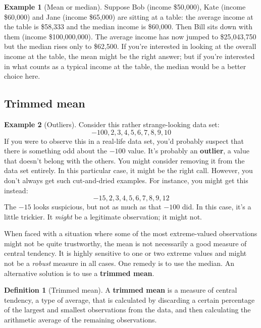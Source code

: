 \documentclass[
]{book}
\theoremstyle{definition}
\newtheorem{definition}{Definition}[chapter]
\theoremstyle{definition}
\newtheorem{example}{Example}[chapter]
\theoremstyle{definition}
\theoremstyle{definition}
\theoremstyle{remark}
\begin{document}
\begin{example}[Mean or median]
\protect\hypertarget{exm:exmeanmedian}{}\label{exm:exmeanmedian}Suppose Bob (income \$50,000), Kate (income \$60,000) and Jane (income \$65,000) are sitting at a table: the average income at the table is \$58,333 and the median income is \$60,000. Then Bill sits down with them (income \$100,000,000). The average income has now jumped to \$25,043,750 but the median rises only to \$62,500. If you're interested in looking at the overall income at the table, the mean might be the right answer; but if you're interested in what counts as a typical income at the table, the median would be a better choice here.
\end{example}

\hypertarget{trimmedmean}{%
\subsection{Trimmed mean}\label{trimmedmean}}

\begin{example}[Outliers]
\protect\hypertarget{exm:exoutliers}{}\label{exm:exoutliers}Consider this rather strange-looking data set:
\[
-100,2,3,4,5,6,7,8,9,10
\]
If you were to observe this in a real-life data set, you'd probably suspect that there is something odd about the \(-100\) value. It's probably an \textbf{outlier}, a value that doesn't belong with the others. You might consider removing it from the data set entirely. In this particular case, it might be the right call. However, you don't always get such cut-and-dried examples. For instance, you might get this instead:
\[
-15,2,3,4,5,6,7,8,9,12
\]
The \(-15\) looks suspicious, but not as much as that \(-100\) did. In this case, it's a little trickier. It \emph{might} be a legitimate observation; it might not.
\end{example}

When faced with a situation where some of the most extreme-valued observations might not be quite trustworthy, the mean is not necessarily a good measure of central tendency. It is highly sensitive to one or two extreme values and might not be a \emph{robust} measure in all cases. One remedy is to use the median. An alternative solution is to use a \textbf{trimmed mean}.

\begin{definition}[Trimmed mean]
\protect\hypertarget{def:deftrimmedmean}{}\label{def:deftrimmedmean}A \textbf{trimmed mean} is a measure of central tendency, a type of average, that is calculated by discarding a certain percentage of the largest and smallest observations from the data, and then calculating the arithmetic average of the remaining observations.
\end{definition}
\end{document}
